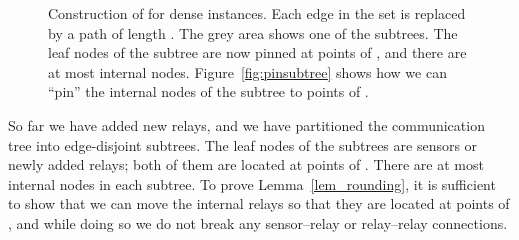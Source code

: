 \documentclass[11pt,a4paper]{article}
\theoremstyle{definition}
\theoremstyle{remark}
\begin{document}
\begin{enumerate}
\begin{figure}
    \centering
    \caption{Construction of  for dense instances. Each edge in the set  is replaced by a path of length . The grey area shows one of the subtrees. The leaf nodes of the subtree are now pinned at points of , and there are at most  internal nodes. Figure~\ref{fig:pinsubtree} shows how we can ``pin'' the internal nodes of the subtree to points of .}\label{fig:snapdense}
\end{figure}

So far we have added  new relays, and we have partitioned the communication tree into edge-disjoint subtrees. The leaf nodes of the subtrees are sensors or newly added relays; both of them are located at points of . There are at most  internal nodes in each subtree. To prove Lemma~\ref{lem_rounding}, it is sufficient to show that we can move the internal relays so that they are located at points of , and while doing so we do not break any sensor--relay or relay--relay connections.


\end{enumerate}
\end{document}
